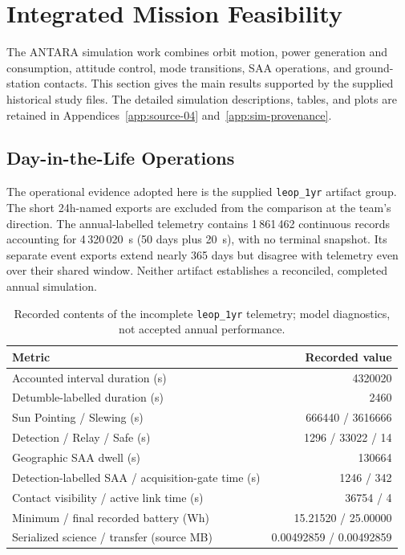 \section{Integrated Mission Feasibility}\label{sec:simulation-results}
The ANTARA simulation work combines orbit motion, power generation and consumption, attitude control, mode transitions, SAA operations, and ground-station contacts. This section gives the main results supported by the supplied historical study files. The detailed simulation descriptions, tables, and plots are retained in Appendices~\ref{app:source-04} and~\ref{app:sim-provenance}.

\subsection{Day-in-the-Life Operations}\label{sec:sim-leop}
The operational evidence adopted here is the supplied \texttt{leop\_1yr} artifact group. The short 24h-named exports are excluded from the comparison at the team's direction. The annual-labelled telemetry contains 1\,861\,462 continuous records accounting for 4\,320\,020~s (50 days plus 20~s), with no terminal snapshot. Its separate event exports extend nearly 365 days but disagree with telemetry even over their shared window. Neither artifact establishes a reconciled, completed annual simulation.

\begin{table}[H]\centering\small
\caption{Recorded contents of the incomplete \texttt{leop\_1yr} telemetry; model diagnostics, not accepted annual performance.}\label{tab:annual-ditl}
\begin{tabularx}{\linewidth}{@{}Xr@{}}\toprule
Metric & Recorded value\\\midrule
Accounted interval duration (s) & 4320020\\
Detumble-labelled duration (s) & 2460\\
Sun Pointing / Slewing (s) & 666440 / 3616666\\
Detection / Relay / Safe (s) & 1296 / 33022 / 14\\
Geographic SAA dwell (s) & 130664\\
Detection-labelled SAA / acquisition-gate time (s) & 1246 / 342\\
Contact visibility / active link time (s) & 36754 / 4\\
Minimum / final recorded battery (Wh) & 15.21520 / 25.00000\\
Serialized science / transfer (source MB) & 0.00492859 / 0.00492859\\\bottomrule
\end{tabularx}\end{table}

